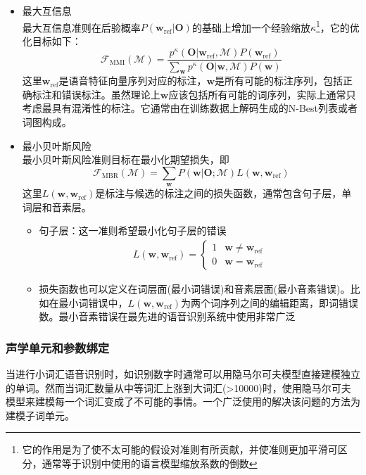 \begin{itemize}
    \item 最大互信息 \\
    最大互信息准则在后验概率$P(\mathbf{w}_{\text{ref}}|\mathbf{O})$的基础上增加一个经验缩放$\kappa$\footnote{它的作用是为了使不太可能的假设对准则有所贡献，并使准则更加平滑可区分，通常等于识别中使用的语言模型缩放系数的倒数}，它的优化目标如下：
    \begin{equation}
        \mathcal{F}_{\text{MMI}}(\mathcal{M})=\frac{p^{\kappa}(\mathbf{O}|\mathbf{w}_{\text{ref}},\mathcal{M})P(\mathbf{w}_{\text{ref}})}{\sum_{\mathbf{w}}p^{\kappa}(\mathbf{O}|\mathbf{w},\mathcal{M})P(\mathbf{w})}
    \end{equation}
    这里$\mathbf{w}_{\text{ref}}$是语音特征向量序列对应的标注，$\mathbf{w}$是所有可能的标注序列，包括正确标注和错误标注。虽然理论上$\mathbf{w}$应该包括所有可能的词序列，实际上通常只考虑最具有混淆性的标注。它通常由在训练数据上解码生成的N-Best列表或者词图构成。
    \item 最小贝叶斯风险 \\
    最小贝叶斯风险准则目标在最小化期望损失，即
    \begin{equation}
        \mathcal{F}_{\text{MBR}}(\mathcal{M})=\sum_{\mathbf{w}}P(\mathbf{w}|\mathbf{O};\mathcal{M})L(\mathbf{w},\mathbf{w}_{\text{ref}})
    \end{equation}
    这里$L(\mathbf{w},\mathbf{w}_{\text{ref}})$是标注与候选的标注之间的损失函数，通常包含句子层，单词层和音素层。
    \begin{itemize}
        \item 句子层：这一准则希望最小化句子层的错误
        \begin{eqnarray}
            L(\mathbf{w},\mathbf{w}_{\text{ref}})=
            \begin{cases}
                1& \mathbf{w} \ne \mathbf{w}_{\text{ref}} \\
                0& \mathbf{w} = \mathbf{w}_{\text{ref}}
            \end{cases}
        \end{eqnarray}
        \item 损失函数也可以定义在词层面(最小词错误)和音素层面(最小音素错误)。比如在最小词错误中，$L(\mathbf{w},\mathbf{w}_{\text{ref}})$为两个词序列之间的编辑距离，即词错误数。最小音素错误在最先进的语音识别系统中使用非常广泛~\cite{povey2005discriminative}
    \end{itemize}
\end{itemize}

\subsubsection{声学单元和参数绑定}
当进行小词汇语音识别时，如识别数字时通常可以用隐马尔可夫模型直接建模独立的单词。然而当词汇数量从中等词汇上涨到大词汇(>10000)时，使用隐马尔可夫模型来建模每一个词汇变成了不可能的事情。一个广泛使用的解决该问题的方法为建模子词单元。

